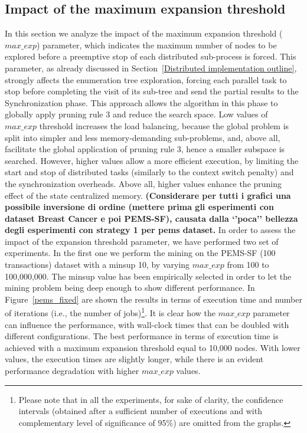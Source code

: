 \subsection{Impact of the maximum expansion threshold}\label{exp_fisso}
In this section we analyze the impact of the maximum expansion threshold
($max\_exp$) parameter, which indicates the maximum number of nodes 
to be explored before a preemptive stop of each distributed sub-process is forced.
This parameter, as already discussed in Section~\ref{Distributed implementation outline},
strongly affects the enumeration tree exploration,
forcing each parallel task to stop before completing the visit of its sub-tree 
and send the partial results to the Synchronization phase. 
This approach allows the algorithm in this phase to globally apply 
pruning rule 3 and reduce the search space.
Low values of $max\_exp$ threshold increases the load balancing, 
because the global problem is split into simpler and less memory-demanding
sub-problems, and, above all, facilitate the global application of pruning rule 3, 
hence a smaller subspace is searched.
However, higher values allow a more efficient execution,
by limiting the start and stop of distributed tasks
(similarly to the context switch penalty) and the synchronization overheads. Above all, higher values enhance the pruning effect of the state centralized memory.
\textbf{(Considerare per tutti i grafici una possibile inversione di ordine (mettere prima gli esperimenti con dataset Breast Cancer e poi PEMS-SF), causata dalla `'poca'' bellezza degli esperimenti con strategy 1 per pems dataset. }
In order to assess the impact of the expansion threshold parameter, we have performed two set of experiments. In the first one we perform the mining on the PEMS-SF (100 transactions) dataset with a minsup 10, by varying $max\_exp$ from 100 to 100,000,000.  The minsup value has been empirically selected in order to let the mining problem being deep enough to show different performance. 
In Figure~\ref{pems_fixed} are shown the results in terms of execution time and number of iterations 
(i.e., the number of jobs)\footnote{Please note that in all the experiments, for sake of clarity, the confidence intervals (obtained after a sufficient number of executions and with  complementary level of significance of 95\%) are omitted from the graphs.}.
It is clear how the $max\_exp$ parameter can influence the performance, with wall-clock times that can be doubled with different configurations. The best performance in terms of execution time is achieved with a maximum
expansion threshold equal to 10,000 nodes. With lower values, the execution times are slightly longer, while there is an evident performance degradation with higher $max\_exp$ values. 
